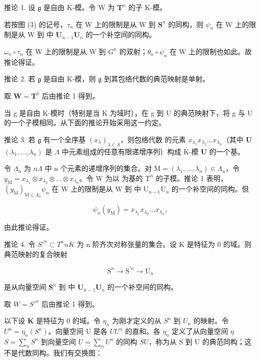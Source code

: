 推论 1. 设 \(\mathfrak{g}\) 是自由 K-模。令 W 为 \(\mathbf{T}^n\) 的子 K-模。

若按图 (3) 的记号，\(\tau_{n}\) 在 W 上的限制是从 W 到 \(\mathbf{S}^n\) 的同构，则 \(\psi_{n}\) 在 W 上的限制是从 W 到  中 \(\mathbf{U}_{n-1}\)\(\mathbf{U}_n\) 的一个补空间的同构。

\(\omega_{n} \circ \tau_{n}\) 在 W 上的限制是从 W 到 \(G^{n}\) 的双射；\(\theta_{n} \circ \psi_{n}\) 在 W 上的限制也如此。故推论得证。

推论 2. 若 \(\mathfrak{g}\) 是自由 K-模，则 \(\mathfrak{g}\) 到其包络代数的典范映射是单射。

取 \(\mathbf{W} = \mathbf{T}^1\) 后由推论 1 得到。

当 g 是自由 K-模时（特别是当 K 为域时），在 g 到 U 的典范映射下，将 g 与 U 的一个子模相同。从下面的推论开始采用这一约定。

推论 3. 若 \(\mathfrak{g}\) 有一个全序基 \((x_{\lambda})_{\lambda \in \Lambda}\)，则包络代数  的元素 \(x_{\lambda_1}x_{\lambda_2}\ldots x_{\lambda_n}\)（其中 \(\mathbf{U}\)\((\lambda_1,\dots ,\lambda_n)\) 是 \(\Lambda\) 中元素组成的任意有限递增序列）构成 K-模 \(\mathbf{U}\) 的一个基。

令 \(\Lambda_{n}\) 为 \(n\)\(\Lambda\) 中 n 个元素的递增序列的集合。对 \(\mathrm{M} = (\lambda_1, \ldots, \lambda_n) \in \Lambda_n\)，令 \(y_{\mathrm{M}} = x_{\lambda_1} \otimes x_{\lambda_2} \otimes \dots \otimes x_{\lambda_n}\)。令 \(\mathrm{W}\) 为以  为基的 \(\mathrm{T}^n\) 的子模。推论 1 表明，\((y_{\mathrm{M}})_{\mathrm{M} \in \Lambda_n}\)\(\psi_n\) 在 \(\mathrm{W}\) 上的限制是从 \(\mathrm{W}\) 到  中 \(\mathrm{U}_{n-1}\)\(\mathrm{U}_n\) 的一个补空间的同构。但

\[
\psi_ {n} (y _ {\mathrm{M}}) = x _ {\lambda_ {1}} x _ {\lambda_ {2}} \dots x _ {\lambda_ {n}},
\]

由此推论得证。

推论 4. 令 \(S'^{n} \subset T^n\)\(n\)\(K\) 为 n 阶齐次对称张量的集合。设 K 是特征为 0 的域。则典范映射的复合映射

\[
\mathrm{S} ^ {n} \rightarrow \mathrm{S} ^ {\prime n} \rightarrow \mathrm{U} _ {n}
\]

是从向量空间 \(\mathbf{S}^n\) 到  中 \(\mathbf{U}_{n-1}\)\(\mathbf{U}_n\) 的一个补空间的同构。

取 \(W = S'^n\) 后由推论 1 得到。

以下设 \(\mathbf{K}\) 是特征为 0 的域。令 \(\eta_{n}\) 为刚才定义的从 \(S^n\) 到 \(U_n\) 的映射。令 \(U^n = \eta_n(S^n)\)。向量空间 U 是各 \(U\)\(U^n\) 的直和。各 \(\eta_{n}\) 定义了从向量空间 \(\eta\)\(S = \sum_{n} S^n\) 到向量空间 \(U = \sum_{n} U^n\) 的同构 \(S\)\(U\)，称为从 S 到 U 的典范同构；这不是代数同构。我们有交换图：

